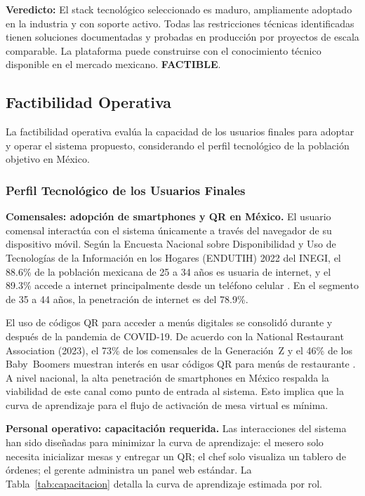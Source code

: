 \noindent\textbf{Veredicto:} El stack tecnológico seleccionado es maduro,
ampliamente adoptado en la industria y con soporte activo. Todas las restricciones
técnicas identificadas tienen soluciones documentadas y probadas en producción
por proyectos de escala comparable. La plataforma puede construirse con el
conocimiento técnico disponible en el mercado mexicano. \textbf{FACTIBLE}.

\FloatBarrier
\subsection{Factibilidad Operativa}

La factibilidad operativa evalúa la capacidad de los usuarios finales para
adoptar y operar el sistema propuesto, considerando el perfil tecnológico de
la población objetivo en México.

\subsubsection{Perfil Tecnológico de los Usuarios Finales}

\noindent\textbf{Comensales: adopción de smartphones y QR en México.}
El usuario comensal interactúa con el sistema únicamente a través del navegador
de su dispositivo móvil. Según la Encuesta Nacional sobre Disponibilidad y Uso de
Tecnologías de la Información en los Hogares (ENDUTIH) 2022 del INEGI, el 88.6\%
de la población mexicana de 25 a 34 años es usuaria de internet, y el 89.3\%
accede a internet principalmente desde un teléfono celular \cite{inegi_endutih_2022}. En el segmento de
35 a 44 años, la penetración de internet es del 78.9\%.

El uso de c\'odigos QR para acceder a men\'us digitales se consolid\'o durante
y despu\'es de la pandemia de COVID-19. De acuerdo con la National Restaurant
Association (2023), el 73\% de los comensales de la Generaci\'on~Z y el 46\%
de los Baby~Boomers muestran inter\'es en usar c\'odigos QR para men\'us de
restaurante \cite{nra_state_2023}. A nivel nacional, la alta penetraci\'on de smartphones en
M\'exico \cite{inegi_endutih_2022} respalda la viabilidad de este canal como punto de entrada al sistema.
Esto implica que la curva de aprendizaje para el flujo de activaci\'on de mesa
virtual es m\'inima.

\noindent\textbf{Personal operativo: capacitación requerida.}
Las interacciones del sistema han sido diseñadas para minimizar la curva de
aprendizaje: el mesero solo necesita inicializar mesas y entregar un QR; el chef
solo visualiza un tablero de órdenes; el gerente administra un panel web estándar.
La Tabla~\ref{tab:capacitacion} detalla la curva de aprendizaje estimada por rol.


